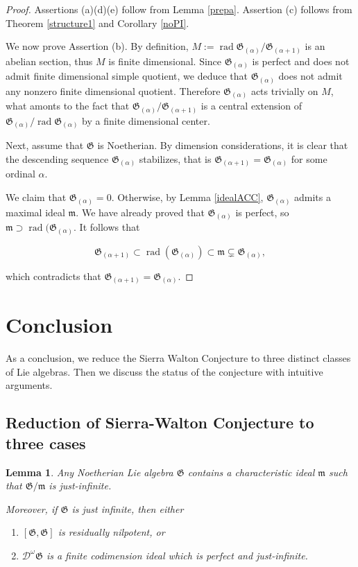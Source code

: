 \documentclass[11pt, letterpaper, reqno]{amsart}
\newtheorem{lemma}[theorem]{Lemma}
\theoremstyle{definition}
\newcommand{\rad}{\operatorname{rad}}
\newcommand{\cD}{\mathscr D}
\newcommand{\fm}{\mathfrak{m}}
\newcommand{\fG}{\mathfrak{G}}
\begin{document}
 \begin{proof} Assertions (a)(d)(e) follow from
 Lemma \ref{prepa}. Assertion (c) follows from
 Theorem \ref{structure1} and   Corollary \ref{noPI}.
 
We now prove Assertion (b).
 By definition, $M:= 
 \rad\fG_{(\alpha)}/\fG_{(\alpha+1)}$ is an abelian section, thus $M$ is finite dimensional.
 Since $\fG_{(\alpha)}$ is perfect and does not admit finite dimensional simple quotient, 
we deduce that  $\fG_{(\alpha)}$ does not admit any nonzero finite dimensional quotient.
Therefore $\fG_{(\alpha)}$ acts trivially on $M$,
what amonts to the fact that 
$\fG_{(\alpha)}/\fG_{(\alpha+1)}$
is a central extension of 
$\fG_{(\alpha)}/\rad\fG_{(\alpha)}$ by a finite
dimensional center.

Next, assume that $\fG$ is Noetherian. 
By dimension considerations, it is clear that
the descending sequence $\fG_{(\alpha)}$ stabilizes, that is $\fG_{(\alpha+1)}=\fG_{(\alpha)}$ for some ordinal $\alpha$.

We claim that $\fG_{(\alpha)}=0$.
Otherwise, by Lemma \ref{idealACC}, $\fG_{(\alpha)}$
admits a maximal ideal $\fm$.
We have already proved that $\fG_{(\alpha)}$
is perfect,  so $\fm\supset \rad(\fG_{(\alpha)}$. It follows that 

$$\fG_{(\alpha+1)}\subset \rad(\fG_{(\alpha)})
\subset\fm\subsetneq \fG_{(\alpha)},$$

\noindent which contradicts that $\fG_{(\alpha+1)}=\fG_{(\alpha)}$.
\end{proof}



\section{Conclusion}\label{conclusion}

As a conclusion, we  reduce the Sierra Walton Conjecture to three distinct classes of Lie algebras. 
Then we discuss the status of the conjecture with 
intuitive arguments.

\subsection{Reduction of Sierra-Walton Conjecture to three cases}

\begin{lemma}\label{prepa3cases} Any  Noetherian Lie algebra
$\fG$ contains a characteristic ideal
$\fm$ such that $\fG/\fm$ is just-infinite.

Moreover, if $\fG$ is just infinite, then either

\begin{enumerate} 
\item[(a)]  $[\fG,\fG]$ is residually 
nilpotent, or
\item[(b)] $\cD^\omega\fG$ is a finite 
codimension ideal which is perfect and just-infinite.
\end{enumerate}
\end{lemma}
\end{document}
